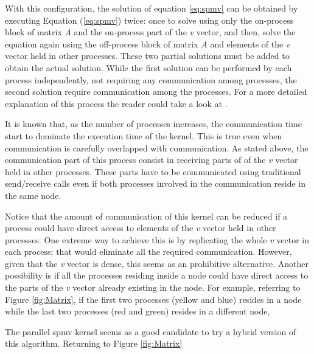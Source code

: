 With this configuration, the solution of equation \ref{eq:spmv} can be obtained by executing Equation (\ref{eq:spmv}) twice: once to solve using only the on-process block of matrix \emph{A} and the on-process part of the \emph{v} vector, and then, solve the equation again using the off-process block of matrix \emph{A} and elements of the \emph{v} vector held in other processes. These two partial solutions must be added to obtain the actual solution. While the first solution can be performed by each process independently, not requiring any communication among processes, the second solution require communication among the processes. For a more detailed explanation of this process the reader could take a look at \cite{BienzGO16}.

\medskip

It is known that, as the number of processes increases, the communication time start to dominate the execution time of the kernel. This is true even when communication is carefully overlapped with communication. As stated above, the communication part of this process consist in receiving parts of of the \emph{v} vector held in other processes. These parts have to be communicated using traditional send/receive calls even if both processes involved in the communication reside in the same node.

\medskip

Notice that the amount of communication of this kernel can be reduced if a process could have direct access to elements of the \emph{v} vector held in other processes. One extreme way to achieve this is by replicating the whole \emph{v} vector in each process; that would eliminate all the required communication. However, given that the \emph{v} vector is dense, this seems as an prohibitive alternative. Another possibility is if all the processes residing inside a node could have direct access to the parts of the \emph{v} vector already existing in the node. For example, referring to Figure \ref{fig:Matrix}, if the first two processes (yellow and blue) resides in a node while the last two processes (red and green) resides in a different node, 



The parallel spmv kernel seems as a good candidate to try a hybrid version of this algorithm. Returning to Figure \ref{fig:Matrix} 


